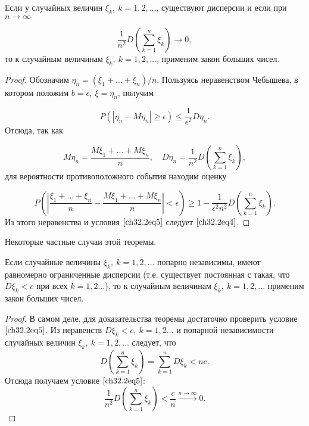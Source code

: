 \begin{thm} [Маркова]
Если у случайных величин $\xi_k, \: k = 1,2,\ldots$, существуют дисперсии и если при $n \to \infty$

\begin{equation} \label{ch32.2eq5}
\frac{1}{n^2} D  \left( \sum_{k  = 1}^{n} \xi_k\right) \to 0,
\end{equation}
то к случайным величинам $\xi_k, \: k = 1,2,\ldots$, применим закон больших чисел.
\end{thm}

\begin{proof}
Обозначим $\eta_n = (\xi_1 + \ldots + \xi_n) / n$. Пользуясь неравенством Чебышева, в котором положим $b = \epsilon, \: \xi = \eta_n$, получим

$$
P \left( \left| \eta_n - M  \eta_n \right| \ge \epsilon \right) \le \frac{1}{\epsilon^2} D  \eta_n.
$$
Отсюда, так как

$$
M  \eta_n = \frac{M \xi_1 + \ldots + M \xi_n}{n}, \quad D \eta_n = \frac{1}{n^2} D  \left( \sum_{k  = 1}^{n} \xi_k\right),
$$ 
для вероятности противоположного события находим оценку

$$
P \left( \left| \frac{\xi_1 + \ldots + \xi_n}{n} - \frac{M \xi_1 + \ldots + M \xi_n}{n} \right| < \epsilon \right) \ge 1 - \frac{1}{\epsilon^2n^2} D  \left( \sum_{k  = 1}^{n} \xi_k\right).
$$
Из этого неравенства и условия $\eqref{ch32.2eq5}$ следует $\eqref{ch32.2eq4}$.
\end{proof}

Некоторые частные случаи этой теоремы.

\begin{thm} [Чебышёва]
Если случайные величины $\xi_k, \: k = 1,2,\ldots$ попарно независимы, имеют равномерно ограниченные дисперсии (т.е. существует постоянная с такая, что $D  \xi_k < c$ при всех $k = 1, 2\ldots$),	то к случайным величинам $\xi_k, \: k = 1,2,\ldots$ применим закон больших чисел.
\end{thm}

\begin{proof}
В самом деле, для доказательства теоремы достаточно проверить условие $\eqref{ch32.2eq5}$. Из неравенств $D  \xi_k < c, \: k = 1, 2\ldots$ и попарной независимости случайных величин $\xi_k, \: k = 1,2,\ldots$ следует, что
$$
D  \left( \sum_{k  = 1}^{n} \xi_k\right) = \sum_{k  = 1}^{n} D  \xi_k  < nc.
$$
Отсюда получаем условие $\eqref{ch32.2eq5}$:
$$
\frac{1}{n^2} D  \left( \sum_{k  = 1}^{n} \xi_k\right) < \frac{c}{n} \xrightarrow{n \to \infty} 0.
$$
\end{proof}

